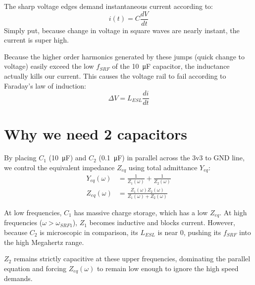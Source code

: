 \documentclass{article}
\begin{document}
The sharp voltage edges demand instantaneous current according to:
\begin{equation}
    i(t) = C \frac{dV}{dt}
\end{equation}
Simply put, because change in voltage in square waves are nearly instant, the current is super high.

Because the higher order harmonics generated by these jumps (quick change to voltage) easily exceed the low $f_{SRF}$ of the \SI{10}{\micro\farad} capacitor, the inductance actually kills our current. This causes the voltage rail to fail according to Faraday's law of induction:
\begin{equation}
    \Delta V = L_{ESL} \frac{di}{dt}
\end{equation}

\section{Why we need 2 capacitors}
By placing $C_1$ (\SI{10}{\micro\farad}) and $C_2$ (\SI{0.1}{\micro\farad}) in parallel across the 3v3 to GND line, we control the equivalent impedance $Z_{eq}$ using total admittance $Y_{eq}$:
\begin{align}
    Y_{eq}(\omega) &= \frac{1}{Z_1(\omega)} + \frac{1}{Z_2(\omega)} \\
    Z_{eq}(\omega) &= \frac{Z_1(\omega) Z_2(\omega)}{Z_1(\omega) + Z_2(\omega)}
\end{align}

At low frequencies, $C_1$ has massive charge storage, which has a low $Z_{eq}$. At high frequencies ($\omega > \omega_{SRF1}$), $Z_1$ becomes inductive and blocks current. However, because $C_2$ is microscopic in comparison, its $L_{ESL}$ is near 0, pushing its $f_{SRF}$ into the high Megahertz range.

$Z_2$ remains strictly capacitive at these upper frequencies, dominating the parallel equation and forcing $Z_{eq}(\omega)$ to remain low enough to ignore the high speed demands.
\end{document}
